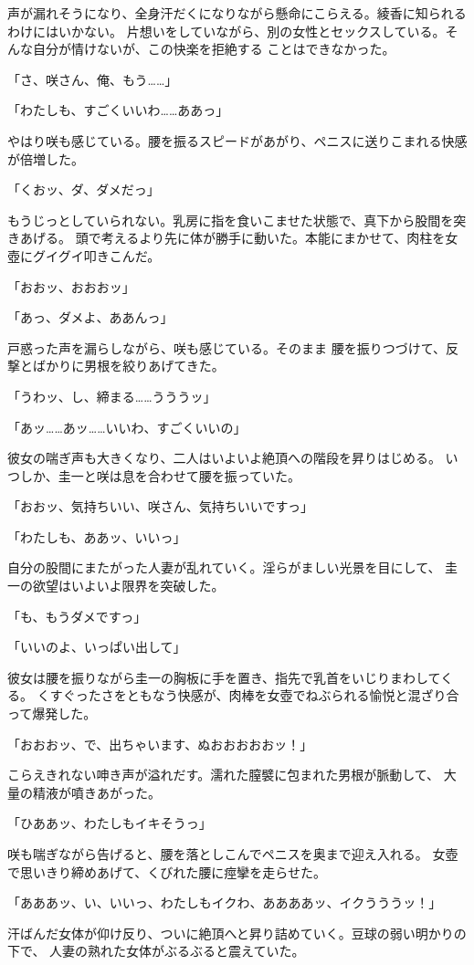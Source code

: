 ﻿\documentclass[
    book,tate,
    line_length=30zw,
    jafontsize=12pt,
    paper=b5j,
    landscape,
    ]{jlreq}
\begin{document}
声が漏れそうになり、全身汗だくになりながら懸命にこらえる。綾香に知られるわけにはいかない。
片想いをしていながら、別の女性とセックスしている。そんな自分が情けないが、この快楽を拒絶する
ことはできなかった。

「さ、咲さん、俺、もう……」

「わたしも、すごくいいわ……ああっ」

やはり咲も感じている。腰を振るスピードがあがり、ペニスに送りこまれる快感が倍増した。

「くおッ、ダ、ダメだっ」

もうじっとしていられない。乳房に指を食いこませた状態で、真下から股間を突きあげる。
頭で考えるより先に体が勝手に動いた。本能にまかせて、肉柱を女壺にグイグイ叩きこんだ。

「おおッ、おおおッ」

「あっ、ダメよ、ああんっ」

戸惑った声を漏らしながら、咲も感じている。そのまま
腰を振りつづけて、反撃とばかりに男根を絞りあげてきた。

「うわッ、し、締まる……うううッ」

「あッ……あッ……いいわ、すごくいいの」

彼女の喘ぎ声も大きくなり、二人はいよいよ絶頂への階段を昇りはじめる。
いつしか、圭一と咲は息を合わせて腰を振っていた。

「おおッ、気持ちいい、咲さん、気持ちいいですっ」

「わたしも、ああッ、いいっ」

自分の股間にまたがった人妻が乱れていく。淫らがましい光景を目にして、
圭一の欲望はいよいよ限界を突破した。

「も、もうダメですっ」

「いいのよ、いっぱい出して」

彼女は腰を振りながら圭一の胸板に手を置き、指先で乳首をいじりまわしてくる。
くすぐったさをともなう快感が、肉棒を女壺でねぶられる愉悦と混ざり合って爆発した。

「おおおッ、で、出ちゃいます、ぬおおおおおッ！」

こらえきれない呻き声が溢れだす。濡れた膣襞に包まれた男根が脈動して、
大量の精液が噴きあがった。

「ひああッ、わたしもイキそうっ」

咲も喘ぎながら告げると、腰を落としこんでペニスを奥まで迎え入れる。
女壺で思いきり締めあげて、くびれた腰に痙攣を走らせた。

「あああッ、い、いいっ、わたしもイクわ、ああああッ、イクうううッ！」

汗ばんだ女体が仰け反り、ついに絶頂へと昇り詰めていく。豆球の弱い明かりの下で、
人妻の熟れた女体がぶるぶると震えていた。
\end{document}

